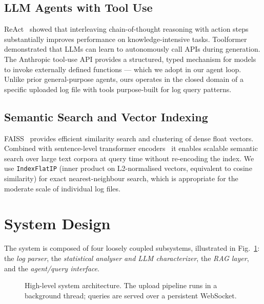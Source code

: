 \documentclass[runningheads]{llncs}
\begin{document}
\subsection{LLM Agents with Tool Use}

ReAct~\cite{yao2023react} showed that interleaving chain-of-thought reasoning
with action steps substantially improves performance on knowledge-intensive
tasks. Toolformer~\cite{schick2023toolformer} demonstrated that LLMs can
learn to autonomously call APIs during generation. The Anthropic tool-use
API provides a structured, typed mechanism for models to invoke externally
defined functions --- which we adopt in our agent loop. Unlike prior general-purpose agents, ours operates in the closed domain
of a specific uploaded log file with tools purpose-built for log query
patterns.

\subsection{Semantic Search and Vector Indexing}

FAISS~\cite{johnson2019faiss} provides efficient similarity search and
clustering of dense float vectors. Combined with sentence-level transformer
encoders~\cite{reimers2019sentencebert} it enables scalable semantic search
over large text corpora at query time without re-encoding the index. We use
\texttt{IndexFlatIP} (inner product on L2-normalised vectors, equivalent to
cosine similarity) for exact nearest-neighbour search, which is appropriate
for the moderate scale of individual log files.

\section{System Design}
\label{sec:design}

The system is composed of four loosely coupled subsystems, illustrated in
Fig.~\ref{fig:arch}: the \emph{log parser}, the \emph{statistical analyser
and LLM characterizer}, the \emph{RAG layer}, and the \emph{agent/query
interface}.

\begin{figure}[htbp]
\centering
{}
\caption{High-level system architecture. The upload pipeline runs in a
background thread; queries are served over a persistent WebSocket.}
\label{fig:arch}
\end{figure}
\end{document}

